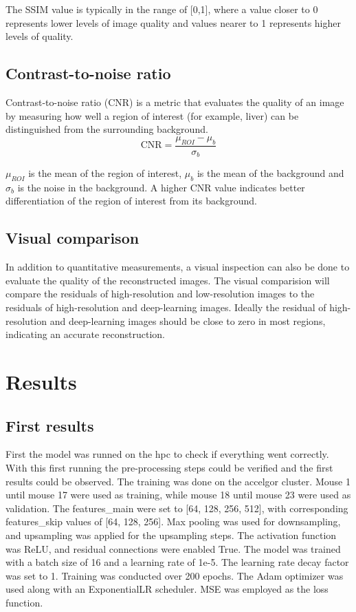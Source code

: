 \documentclass[twocolumn]{article}
\begin{document}
 The SSIM value is typically in the range of [0,1], where a value closer to 0 represents lower levels of image quality and values nearer to 1 represents higher levels of quality. \cite{dosselmann-2009}

 \subsection{Contrast-to-noise ratio}
 Contrast-to-noise ratio (CNR) is a metric that evaluates the quality of an image by measuring how well a region of interest (for example, liver) can be distinguished from the surrounding background.
\begin{equation}\label{CNR}
\text{CNR}=\frac{\mu_{ROI}-\mu_b}{\sigma_b}
\end{equation}

$\mu_{ROI}$ is the mean of the region of interest, $\mu_b$ is the mean of the background and $\sigma_b$ is the noise in the background.
A higher CNR value indicates better differentiation of the region of interest from its background.

\subsection{Visual comparison}
In addition to quantitative measurements, a visual inspection can also be done to evaluate the quality of the reconstructed images. 
The visual comparision will compare the residuals of high-resolution and low-resolution images to the residuals of high-resolution and deep-learning images. 
Ideally the residual of high-resolution and deep-learning images should be close to zero in most regions, indicating an accurate reconstruction. 

\section{Results}
\subsection{First results}
First the model was runned on the hpc to check if everything went correctly. 
With this first running the pre-processing steps could be verified and the first results could be observed. 
The training was done on the accelgor cluster. 
Mouse 1 until mouse 17 were used as training, while mouse 18 until mouse 23 were used as validation.  
The features\_main were set to [64, 128, 256, 512], with corresponding features\_skip values of [64, 128, 256]. 
Max pooling was used for downsampling, and upsampling was applied for the upsampling steps. 
The activation function was ReLU, and residual connections were enabled True.
The model was trained with a batch size of 16 and a learning rate of 1e-5. 
The learning rate decay factor was set to 1. Training was conducted over 200 epochs. 
The Adam optimizer was used along with an ExponentialLR scheduler. MSE was employed as the loss function.
\end{document}
